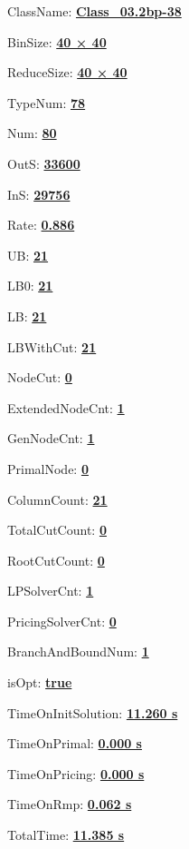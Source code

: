 \documentclass[11pt]{article}
\begin{document}
\pagestyle{empty}


ClassName: \underline{\textbf{Class_03.2bp-38}}
\par
BinSize: \underline{\textbf{40 × 40}}
\par
ReduceSize: \underline{\textbf{40 × 40}}
\par
TypeNum: \underline{\textbf{78}}
\par
Num: \underline{\textbf{80}}
\par
OutS: \underline{\textbf{33600}}
\par
InS: \underline{\textbf{29756}}
\par
Rate: \underline{\textbf{0.886}}
\par
UB: \underline{\textbf{21}}
\par
LB0: \underline{\textbf{21}}
\par
LB: \underline{\textbf{21}}
\par
LBWithCut: \underline{\textbf{21}}
\par
NodeCut: \underline{\textbf{0}}
\par
ExtendedNodeCnt: \underline{\textbf{1}}
\par
GenNodeCnt: \underline{\textbf{1}}
\par
PrimalNode: \underline{\textbf{0}}
\par
ColumnCount: \underline{\textbf{21}}
\par
TotalCutCount: \underline{\textbf{0}}
\par
RootCutCount: \underline{\textbf{0}}
\par
LPSolverCnt: \underline{\textbf{1}}
\par
PricingSolverCnt: \underline{\textbf{0}}
\par
BranchAndBoundNum: \underline{\textbf{1}}
\par
isOpt: \underline{\textbf{true}}
\par
TimeOnInitSolution: \underline{\textbf{11.260 s}}
\par
TimeOnPrimal: \underline{\textbf{0.000 s}}
\par
TimeOnPricing: \underline{\textbf{0.000 s}}
\par
TimeOnRmp: \underline{\textbf{0.062 s}}
\par
TotalTime: \underline{\textbf{11.385 s}}
\par
\newpage


\end{document}
